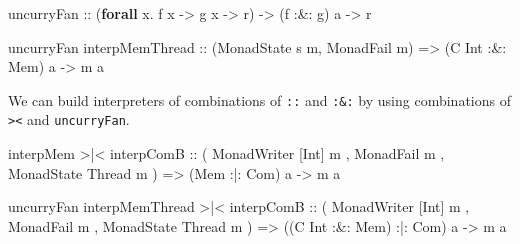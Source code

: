 \documentclass[]{article}
\newenvironment{Shaded}{}{}
\newcommand{\DataTypeTok}[1]{\textcolor[rgb]{0.56,0.13,0.00}{#1}}
\newcommand{\KeywordTok}[1]{\textcolor[rgb]{0.00,0.44,0.13}{\textbf{#1}}}
\newcommand{\NormalTok}[1]{#1}
\newcommand{\OperatorTok}[1]{\textcolor[rgb]{0.40,0.40,0.40}{#1}}
\newcommand{\OtherTok}[1]{\textcolor[rgb]{0.00,0.44,0.13}{#1}}
\begin{document}
\begin{Shaded}
\begin{Highlighting}[]
\NormalTok{uncurryFan}
\OtherTok{    ::}\NormalTok{ (}\KeywordTok{forall}\NormalTok{ x}\OperatorTok{.}\NormalTok{ f x }\OtherTok{{-}\textgreater{}}\NormalTok{ g x }\OtherTok{{-}\textgreater{}}\NormalTok{ r)}
    \OtherTok{{-}\textgreater{}}\NormalTok{ (f }\OperatorTok{:\&:}\NormalTok{ g) a}
    \OtherTok{{-}\textgreater{}}\NormalTok{ r}

\NormalTok{uncurryFan interpMemThread}
\OtherTok{    ::}\NormalTok{ (}\DataTypeTok{MonadState}\NormalTok{ s m, }\DataTypeTok{MonadFail}\NormalTok{ m)}
    \OtherTok{=\textgreater{}}\NormalTok{ (}\DataTypeTok{C} \DataTypeTok{Int} \OperatorTok{:\&:} \DataTypeTok{Mem}\NormalTok{) a}
    \OtherTok{{-}\textgreater{}}\NormalTok{ m a}
\end{Highlighting}
\end{Shaded}

We can build interpreters of combinations of \texttt{:\textbar{}:} and
\texttt{:\&:} by using combinations of
\texttt{\textgreater{}\textbar{}\textless{}} and \texttt{uncurryFan}.

\begin{Shaded}
\begin{Highlighting}[]
\NormalTok{interpMem }\OperatorTok{\textgreater{}|\textless{}}\NormalTok{ interpComB}
\OtherTok{    ::}\NormalTok{ ( }\DataTypeTok{MonadWriter}\NormalTok{ [}\DataTypeTok{Int}\NormalTok{] m}
\NormalTok{       , }\DataTypeTok{MonadFail}\NormalTok{ m}
\NormalTok{       , }\DataTypeTok{MonadState} \DataTypeTok{Thread}\NormalTok{ m}
\NormalTok{       )}
    \OtherTok{=\textgreater{}}\NormalTok{ (}\DataTypeTok{Mem} \OperatorTok{:|:} \DataTypeTok{Com}\NormalTok{) a}
    \OtherTok{{-}\textgreater{}}\NormalTok{ m a}

\NormalTok{uncurryFan interpMemThread }\OperatorTok{\textgreater{}|\textless{}}\NormalTok{ interpComB}
\OtherTok{    ::}\NormalTok{ ( }\DataTypeTok{MonadWriter}\NormalTok{ [}\DataTypeTok{Int}\NormalTok{] m}
\NormalTok{       , }\DataTypeTok{MonadFail}\NormalTok{ m}
\NormalTok{       , }\DataTypeTok{MonadState} \DataTypeTok{Thread}\NormalTok{ m}
\NormalTok{       )}
    \OtherTok{=\textgreater{}}\NormalTok{ ((}\DataTypeTok{C} \DataTypeTok{Int} \OperatorTok{:\&:} \DataTypeTok{Mem}\NormalTok{) }\OperatorTok{:|:} \DataTypeTok{Com}\NormalTok{) a}
    \OtherTok{{-}\textgreater{}}\NormalTok{ m a}
\end{Highlighting}
\end{Shaded}
\end{document}
